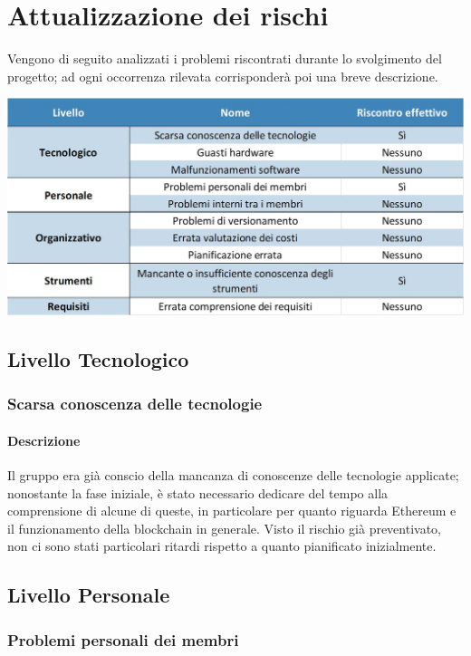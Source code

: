 \newpage
\appendix
\section{Attualizzazione dei rischi} \label{RiscontroRischi}

Vengono di seguito analizzati i problemi riscontrati durante lo svolgimento del progetto; ad ogni occorrenza rilevata corrisponderà poi una breve descrizione.\\

\begin{center}
	\centerline{\includegraphics[scale=0.50]{img/RiscontroProblemi.jpg}}
\end{center}

\subsection{Livello Tecnologico}
\subsubsection{Scarsa conoscenza delle tecnologie}
\paragraph {Descrizione}
Il gruppo era già conscio della mancanza di conoscenze delle tecnologie applicate; nonostante la fase iniziale, è stato necessario dedicare del tempo alla comprensione di alcune di queste, in particolare per quanto riguarda Ethereum e il funzionamento della blockchain in generale. Visto il rischio già preventivato, non ci sono stati particolari ritardi rispetto a quanto pianificato inizialmente.

\subsection{Livello Personale}
\subsubsection{Problemi personali dei membri}
